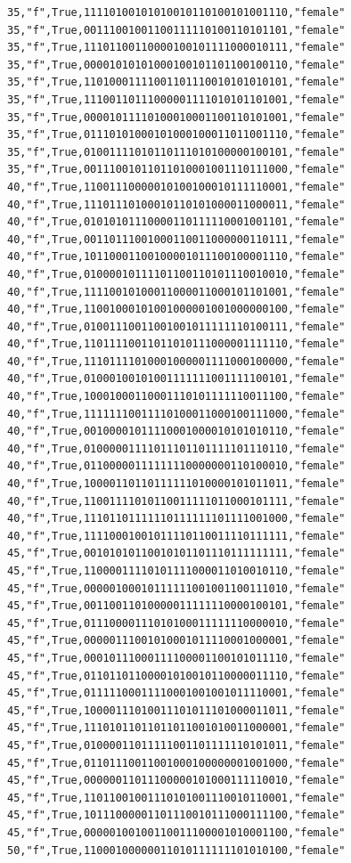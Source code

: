 \documentclass[authoryearcitations]{UoYCSproject}
\begin{document}
\begin{framed}
\begin{verbatim}
35,"f",True,11110100101010010110100101001110,"female"
35,"f",True,00111001001100111110100110101101,"female"
35,"f",True,11101100110000100101111000010111,"female"
35,"f",True,00001010101000100101101100100110,"female"
35,"f",True,11010001111001101110010101010101,"female"
35,"f",True,11100110111000001111010101101001,"female"
35,"f",True,00001011110100010001100110101001,"female"
35,"f",True,01110101000101000100011011001110,"female"
35,"f",True,01001111010110111010100000100101,"female"
35,"f",True,00111001011011010001001110111000,"female"
40,"f",True,11001110000010100100010111110001,"female"
40,"f",True,11101110100010110101000011000011,"female"
40,"f",True,01010101110000110111110001001101,"female"
40,"f",True,00110111001000110011000000110111,"female"
40,"f",True,10110001100100001011100100001110,"female"
40,"f",True,01000010111101100110101110010010,"female"
40,"f",True,11110010100011000011000101101001,"female"
40,"f",True,11001000101001000001001000000100,"female"
40,"f",True,01001110011001001011111110100111,"female"
40,"f",True,11011110011011010111000001111110,"female"
40,"f",True,11101111010001000001111000100000,"female"
40,"f",True,01000100101001111111001111100101,"female"
40,"f",True,10001000110001110101111110011100,"female"
40,"f",True,11111110011110100011000100111000,"female"
40,"f",True,00100001011110001000010101010110,"female"
40,"f",True,01000001111011101101111101110110,"female"
40,"f",True,01100000111111110000000110100010,"female"
40,"f",True,10000110110111111010000101011011,"female"
40,"f",True,11001111010110011111011000101111,"female"
40,"f",True,11101101111110111111101111001000,"female"
40,"f",True,11110001001011110110011110111111,"female"
45,"f",True,00101010110010101101110111111111,"female"
45,"f",True,11000011110101111000011010010110,"female"
45,"f",True,00000100010111111001001100111010,"female"
45,"f",True,00110011010000011111110000100101,"female"
45,"f",True,01110000111010100011111110000010,"female"
45,"f",True,00000111001010001011110001000001,"female"
45,"f",True,00010111000111100001100101011110,"female"
45,"f",True,01101101100001010010110000011110,"female"
45,"f",True,01111100011110001001001011110001,"female"
45,"f",True,10000111010011101011101000011011,"female"
45,"f",True,11101011011011011001010011000001,"female"
45,"f",True,01000011011111001101111110101011,"female"
45,"f",True,01101110011001000100000001001000,"female"
45,"f",True,00000011011100000101000111110010,"female"
45,"f",True,11011001001110101001110010110001,"female"
45,"f",True,10111000001101110010111000111100,"female"
45,"f",True,00000100100110011100001010001100,"female"
50,"f",True,11000100000011010111111101010100,"female"

\end{verbatim}
\end{framed}
\end{document}
